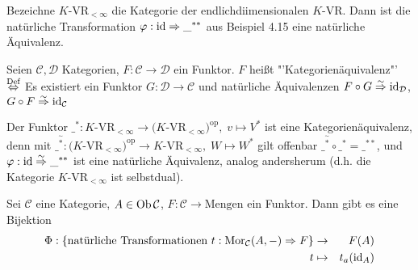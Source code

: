\begin{bsp}
	Bezeichne $K$-VR$_{<\infty}$ die Kategorie der endlichdiimensionalen $K$-VR. Dann ist die natürliche Transformation $\varphi:\operatorname{id} \Rightarrow \_^{**}$ aus Beispiel 4.15 eine natürliche Äquivalenz.
\end{bsp}
\begin{df}
	Seien $\mathcal{C}, \mathcal{D}$ Kategorien, $F:\mathcal{C} \to \mathcal{D}$ ein Funktor. $F$ heißt "'Kategorienäquivalenz"' $\overset{\text{Def}}{\Leftrightarrow}$ Es existiert ein Funktor $G: \mathcal{D} \to \mathcal{C}$ und natürliche Äquivalenzen $F \circ G \overset{\sim}{\Rightarrow} \operatorname{id}_{\mathcal{D}}$, $G\circ F \overset{\sim}{\Rightarrow} \operatorname{id}_{\mathcal{C}}$
\end{df}
\begin{bsp}
	Der Funktor $\_^*: K$-VR$_{<\infty} \to (K$-VR$_{<\infty})^\text{op}, \; v \mapsto V^*$ ist eine Kategorienäquivalenz, denn mit $\_^{\overset{\sim}{*}}: (K$-VR$_{<\infty})^\text{op} \to K$-VR$_{<\infty}, \; W \mapsto W^*$ gilt offenbar $\_^{\overset{\sim}{*}} \circ \_^* = \_^{**}$, und $\varphi:\operatorname{id} \overset{\sim}{\Rightarrow}  \_^{**}$ ist eine natürliche Äquivalenz, analog andersherum (d.h. die Kategorie $K$-VR$_{< \infty}$ ist selbstdual).
\end{bsp}
\begin{sa}
	Sei $\mathcal{C}$ eine Kategorie, $A\in \text{Ob}\,\mathcal{C}$, $F:\mathcal{C} \to \text{Mengen}$ ein Funktor. Dann gibt es eine Bijektion 
	\begin{eqnarray*}
	\Phi: \{\text{natürliche Transformationen }t:\text{Mor}_{\mathcal{C}}(A, -) \Rightarrow F\} & \to & F(A) \\
	t & \mapsto & t_a(\operatorname{id}_A)
	\end{eqnarray*}
\end{sa}

